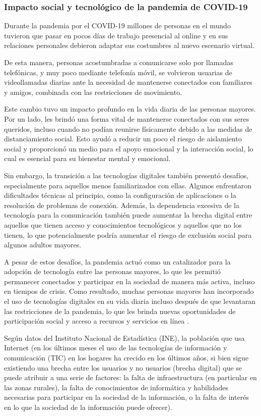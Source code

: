 \subsubsection{Impacto social y tecnológico de la pandemia de COVID-19}

Durante la pandemia por el COVID-19 millones de personas en el mundo tuvieron que pasar en pocos días de trabajo presencial al online y en sus relaciones personales debieron adaptar sus costumbres al nuevo escenario virtual.

De esta manera, personas acostumbradas a comunicarse solo por llamadas telefónicas, y muy poco mediante telefonía móvil, se volvieron usuarias de videollamadas diarias ante la necesidad de mantenerse conectados con familiares y amigos, combinada con las restricciones de movimiento.

Este cambio tuvo un impacto profundo en la vida diaria de las personas mayores. Por un lado, les brindó una forma vital de mantenerse conectados con sus seres queridos, incluso cuando no podían reunirse físicamente debido a las medidas de distanciamiento social. Esto ayudó a reducir un poco el riesgo de aislamiento social y proporcionó un medio para el apoyo emocional y la interacción social, lo cual es esencial para su bienestar mental y emocional.

Sin embargo, la transición a las tecnologías digitales también presentó desafíos, especialmente para aquellos menos familiarizados con ellas. Algunos enfrentaron dificultades técnicas al principio, como la configuración de aplicaciones o la resolución de problemas de conexión. Además, la dependencia excesiva de la tecnología para la comunicación también puede aumentar la brecha digital entre aquellos que tienen acceso y conocimientos tecnológicos y aquellos que no los tienen, lo que potencialmente podría aumentar el riesgo de exclusión social para algunos adultos mayores.

A pesar de estos desafíos, la pandemia actuó como un catalizador para la adopción de tecnología entre las personas mayores, lo que les permitió permanecer conectados y participar en la sociedad de manera más activa, incluso en tiempos de crisis. Como resultado, muchas personas mayores han incorporado el uso de tecnologías digitales en su vida diaria incluso después de que levantaran las restricciones de la pandemia, lo que les brinda nuevas oportunidades de participación social y acceso a recursos y servicios en línea \parencite{intro2}.

Según datos del Instituto Nacional de Estadística (INE), la población que usa Internet (en los últimos meses el uso de las tecnologías de información y comunicación (TIC) en los hogares ha crecido en los últimos años, si bien sigue existiendo una brecha entre los usuarios y no usuarios (brecha digital) que se puede atribuir a una serie de factores: la falta de infraestructura (en particular en las zonas rurales), la falta de conocimientos de informática y habilidades necesarias para participar en la sociedad de la información, o la falta de interés en lo que la sociedad de la información puede ofrecer).

